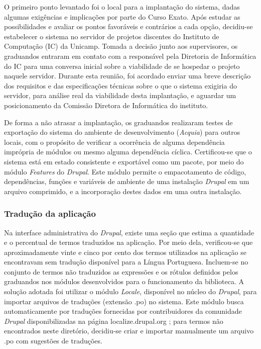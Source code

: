 \documentclass[a4paper]{article}
\begin{document}
O primeiro ponto levantado foi o local para a implantação do sistema, dadas algumas exigências e implicações por parte do Curso Exato. Após estudar as possibilidades e avaliar os pontos favoráveis e contrários a cada opção, decidiu-se estabelecer o sistema no servidor de projetos discentes do Instituto de Computação (IC) da Unicamp. Tomada a decisão junto aos supervisores, os graduandos entraram em contato com a responsável pela Diretoria de Informática do IC para uma conversa inicial sobre a viabilidade de se hospedar o projeto naquele servidor. Durante esta reunião, foi acordado enviar uma breve descrição dos requisitos e das especificações técnicas sobre o que o sistema exigiria do servidor, para análise real da viabilidade desta implantação, e aguardar um posicionamento da Comissão Diretora de Informática do instituto.

De forma a não atrasar a implantação, os graduandos realizaram testes de exportação do sistema do ambiente de desenvolvimento (\textit{Acquia}) para outros locais, com o propósito de verificar a ocorrência de alguma dependência imprópria de módulos ou mesmo alguma dependência cíclica. Certificou-se que o sistema está em estado consistente e exportável como um pacote, por meio do módulo \textit{Features} do \textit{Drupal}. Este módulo permite o empacotamento de código, dependências, funções e variáveis de ambiente de uma instalação \textit{Drupal} em um arquivo comprimido, e a incorporação destes dados em uma outra instalação.

\subsubsection{Tradução da aplicação}

Na interface administrativa do \textit{Drupal}, existe uma seção que estima a quantidade e o percentual de termos traduzidos na aplicação. Por meio dela, verificou-se que aproximadamente vinte e cinco por cento dos termos utilizados na aplicação se encontravam sem tradução disponível para a Língua Portuguesa. Incluem-se no conjunto de termos não traduzidos as expressões e os rótulos definidos pelos graduandos nos módulos desenvolvidos para o funcionamento da biblioteca. A solução adotada foi utilizar o módulo \textit{Locale}, disponível no núcleo do \textit{Drupal}, para importar arquivos de traduções (extensão .po) no sistema. Este módulo busca automaticamente por traduções fornecidas por contribuidores da comunidade \textit{Drupal} disponibilizadas na página localize.drupal.org \cite{localize}; para termos não encontrados neste diretório, decidiu-se criar e importar manualmente um arquivo .po com sugestões de traduções.
\end{document}
